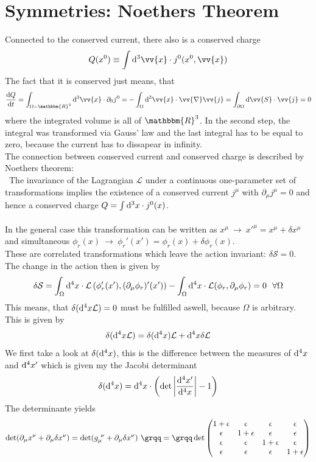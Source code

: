 \documentclass{include/thesisclass}
\newcommand{\LL}{\mathcal{L}}
\newcommand{\SSS}{\mathcal{S}}
\newcommand{\cc}{\cdot}
\newcommand{\vx}{\vv{x}}
\newcommand{\df}{\rightarrow}
\newcommand{\dd}{{\rm d}}
\newcommand{\p}{\partial}
\newcommand{\eps}{\epsilon}
\newcommand{\vn}{\vv{\nabla}}
\begin{document}
\section{Symmetries: Noethers Theorem}
Connected to the conserved current, there also is a conserved charge
\[ Q(x^0) \equiv \int \dd^3 \vx \cc j^0(x^0, \vx)\]
The fact that it is conserved just means, that 
\[ \frac{ \dd Q}{\dd t} = \int_{\Omega = \mathbbm{R}^3} \dd^3 \vx \cc \p_0 j^0 = - \int_\Omega \dd^3 \vx\cc \vn \vv{j} = \int_{\p \Omega} \dd \vv{S} \cc \vv{j} = 0\]
where the integrated volume is all of $\mathbbm{R}^3$. In the second step, the integral was transformed via Gauss' law and the last integral has to be equal to zero, because the current has to dissapear in infinity.\\
The connection between conserved current and conserved charge is described by Noethers theorem:\\\
The invariance of the Lagrangian $\LL$ under a continuous one-parameter set of transformations implies the existence of a conserved current $j^\mu$ with $\p_\mu j^\mu = 0$ and hence a conserved charge $Q = \int \dd ^3 x \cc j^0(x)$.\\
\\
In the general case this transformation can be written as $x^\mu ~\df ~ x'^\mu = x^\mu + \delta x^\mu$ and simultaneous $\phi_r(x) ~\df~ \phi_r'(x') = \phi_r(x) + \delta \phi_r(x)$.\\
These are correlated transformations which leave the action invariant: $\delta \SSS = 0$. The change in the action then is given by
\[ \delta \SSS = \int_\Omega \dd^4 x \cc \LL\left(\phi_r'(x'), (\p_\mu \phi_r)'(x')\right) - \int_\Omega \dd^4 x \cc \LL(\phi_r, \p_\mu \phi_r) = 0~~ \forall \Omega\]
This means, that $\delta(\dd ^4 x \LL) = 0$ must be fulfilled aswell, because $\Omega$ is arbitrary. This is given by
\[ \delta( \dd^4 x \LL) = \delta( \dd^4x) \LL + \dd^4x \delta\LL\]
We first take a look at $\delta( \dd^4 x)$, this is the difference between the measures of $\dd^4x$ and $\dd^4 x'$ which is given my the Jacobi determinant
\[ \delta( \dd^4 x) = \dd^4 x \cc \left( \det\left| \frac{\dd^4 x'}{\dd^4 x} \right| - 1\right)\]
The determinante yields
\[ \det( \p_\mu x^\nu + \p_\mu \delta x^\nu) = \det( g_\mu^{~\nu} + \p_\mu \delta x^\nu) ~\grqq = \grqq \det\begin{pmatrix}1+\eps & \eps & \eps & \eps\\ \eps &  1+ \eps & \eps & \eps \\ \eps & \eps & 1+ \eps & \eps \\ \eps & \eps & \eps & 1+ \eps \end{pmatrix}\]
\end{document}
